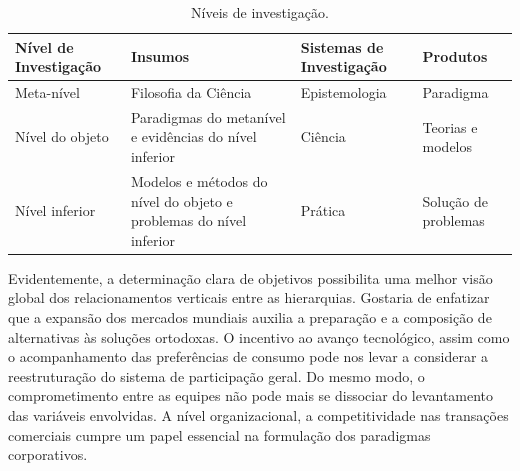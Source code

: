 \begin{table}[htb]
\ABNTEXfontereduzida
\caption[Níveis de investigação]{Níveis de investigação.}
\label{tab-nivinv}
\begin{tabular}{p{2.6cm}|p{6.0cm}|p{2.25cm}|p{3.40cm}}
   \textbf{Nível de Investigação} & \textbf{Insumos}  & \textbf{Sistemas de Investigação}  & \textbf{Produtos}  \\
    \hline
    Meta-nível & Filosofia\index{filosofia} da Ciência  & Epistemologia &
    Paradigma  \\
    \hline
    Nível do objeto & Paradigmas do metanível e evidências do nível inferior &
    Ciência  & Teorias e modelos \\
    \hline
    Nível inferior & Modelos e métodos do nível do objeto e problemas do nível inferior & Prática & Solução de problemas  \\
\end{tabular}
\end{table}

Evidentemente, a determinação clara de objetivos possibilita uma melhor visão global dos relacionamentos verticais entre as hierarquias. Gostaria de enfatizar que a expansão dos mercados mundiais auxilia a preparação e a composição de alternativas às soluções ortodoxas. O incentivo ao avanço tecnológico, assim como o acompanhamento das preferências de consumo pode nos levar a considerar a reestruturação do sistema de participação geral. Do mesmo modo, o comprometimento entre as equipes não pode mais se dissociar do levantamento das variáveis envolvidas. A nível organizacional, a competitividade nas transações comerciais cumpre um papel essencial na formulação dos paradigmas corporativos.

\begin{table}[htb]
\end{table}


